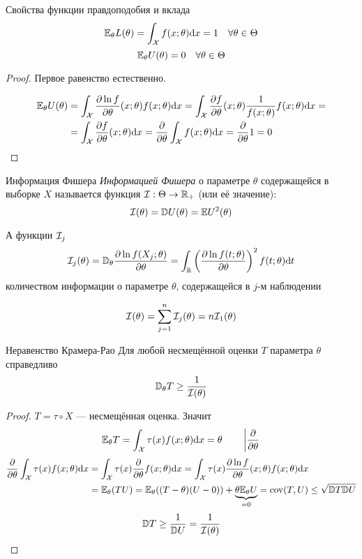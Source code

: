 \begin{thm}{Свойства функции правдоподобия и вклада}
$$\mathbb E_\theta L(\theta) = \int_\mathcal X f(x;\theta) \mathrm d x = 1 \quad\forall\theta\in\Theta$$
$$\mathbb E_\theta U(\theta) = 0 \quad\forall\theta\in\Theta$$
\end{thm}
\begin{proof}
Первое равенство естественно.

$$\begin{aligned}
\mathbb E_\theta U(\theta)
&= \int_\mathcal X \frac{\partial\ln f}{\partial\theta}(x;\theta) f(x;\theta)\mathrm d x
 = \int_\mathcal X \frac{\partial f}{\partial\theta}(x;\theta) \frac1{f(x;\theta)} f(x;\theta)\mathrm d x=\\
&= \int_\mathcal X \frac{\partial f}{\partial\theta}(x;\theta)\mathrm d x
 = \frac{\partial}{\partial\theta} \int_\mathcal X f(x;\theta)\mathrm d x
 = \frac{\partial}{\partial\theta} 1
 = 0
\end{aligned}$$
\end{proof}

\begin{dfn}{Информация Фишера}
\emph{Информацией Фишера}
о параметре $\theta$
содержащейся в выборке $X$
называется функция $\mathcal I:\Theta\to\mathbb R_+$ (или её значение):
$$\mathcal I(\theta) = \mathbb D U(\theta) = \mathbb E U^2(\theta)$$

А функции $\mathcal I_j$
$$\mathcal I_j(\theta)
= \mathbb D_\theta \frac{\partial\ln f(X_j;\theta)}{\partial\theta}
= \int_\mathbb R \left(\frac{\partial\ln f(t;\theta)}{\partial\theta}\right)^2 f(t;\theta) \mathrm d t $$
количеством информации о параметре $\theta$,
содержащейся в $j$-м наблюдении

$$\mathcal I(\theta) = \sum_{j=1}^n \mathcal I_j(\theta) = n\mathcal I_1(\theta)$$
\end{dfn}

\begin{thm}{Неравенство Крамера-Рао}
Для любой несмещённой оценки $T$ параметра $\theta$ справедливо
$$\mathbb D_\theta T \geq \frac{1}{\mathcal I(\theta)}$$
\end{thm}
\begin{proof}
$T=\tau\circ X$ --- несмещённая оценка. Значит
$$\mathbb E_\theta T = \int_\mathcal X \tau(x)f(x;\theta) \mathrm d x = \theta
\qquad \left|\frac\partial{\partial\theta}\right.$$
$$\begin{aligned}
\frac\partial{\partial\theta}\int_\mathcal X \tau(x)f(x;\theta)\mathrm d x
&= \int_\mathcal X \tau(x) \frac\partial{\partial\theta} f(x;\theta)\mathrm d x
 = \int_\mathcal X \tau(x) \frac{\partial\ln f}{\partial\theta}(x;\theta)f(x;\theta)\mathrm d x \\
&= \mathbb E_\theta(T U) = \mathbb E_\theta((T - \theta)(U-0)) + \underbrace{\theta\mathbb E_\theta U}_{=0}
 = \mathrm{cov}(T,U)
 \leq \sqrt{\mathbb D T \mathbb D U}
\end{aligned}$$
$$\mathbb D T \geq \frac{1}{\mathbb D U} = \frac{1}{\mathcal I(\theta)}$$
\end{proof}
